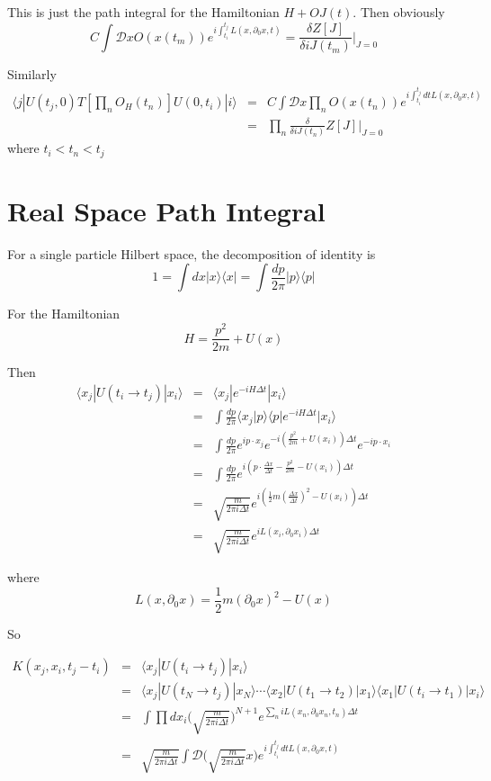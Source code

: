 \documentclass[12pt]{book}
\begin{document}
	This is just the path integral for the Hamiltonian $H+OJ(t)$. Then obviously
	\begin{equation}
		C\int \mathcal D x O(x(t_m))e^{i\int_{t_i}^{t_j}L(x,\partial_0 x,t)}=\frac {\delta Z[J]}{\delta iJ(t_m)}\bigg|_{J=0}
	\end{equation}
	
	Similarly
	\begin{eqnarray}
		\langle j|U(t_j,0)T[\prod_nO_H(t_n)]U(0,t_i)|i\rangle&=&C\int \mathcal D x\prod_n O(x(t_n))e^{i\int_{t_i}^{t_j}dtL(x,\partial_0 x,t)}\\
		&=&\prod_n\frac {\delta}{\delta iJ(t_n)}Z[J]|_{J=0}
	\end{eqnarray}
	where $t_i<t_n<t_j$
	\section{Real Space Path Integral}
	For a single particle Hilbert space, the decomposition of identity is
	\begin{equation}
		1=\int dx|x\rangle\langle x|=\int\frac{dp}{2\pi}|p\rangle\langle p|
	\end{equation}
	
	For the Hamiltonian 
	\begin{equation}
		H=\frac{p^2}{2m}+U(x)
	\end{equation}
	
	Then
	\begin{eqnarray}
		\langle x_j|U(t_i\rightarrow t_j)|x_i\rangle&=&\langle x_j|e^{-iH\Delta t}|x_i\rangle\\
		&=&\int\frac {dp}{2\pi}\langle x_j|p\rangle\langle p|e^{-iH\Delta t}|x_i\rangle\\
		&=&\int\frac {dp}{2\pi}e^{ip\cdot x_j}e^{-i(\frac {p^2}{2m}+U(x_i))\Delta t}e^{-ip\cdot x_i}\\
		&=&\int\frac {dp}{2\pi}e^{i(p\cdot\frac {\Delta x}{\Delta t}-\frac {p^2}{2m}-U(x_i))\Delta t}\\
		&=&\sqrt{\frac{m}{2\pi i\Delta t}}e^{i(\frac 12m(\frac{\Delta x}{\Delta t})^2-U(x_i))\Delta t}\\
		&=&\sqrt{\frac{m}{2\pi i\Delta t}}e^{iL(x_i,\partial_0 x_i)\Delta t}
	\end{eqnarray}
	
	where
	\begin{equation}
		L(x,\partial_0x)=\frac 12m(\partial_0x)^2-U(x)
	\end{equation}
	
	So
	
	\begin{eqnarray}
		K(x_j,x_i,t_j-t_i)&=&\langle x_j|U(t_i\rightarrow t_j)|x_i\rangle\\
		&=& \langle x_j|U(t_N\rightarrow t_j)|x_N\rangle\cdots \langle x_2|U(t_1 \rightarrow t_2)|x_1\rangle \langle x_1|U(t_i \rightarrow t_1)|x_i\rangle\\
		&=&\int\prod dx_i\bigg(\sqrt{\frac{m}{2\pi i\Delta t}}\bigg)^{N+1}e^{\sum_n iL( x_n,\partial_0  x_n,t_n)\Delta t}\\
		&=&\sqrt{\frac{m}{2\pi i\Delta t}}\int \mathcal D\bigg(\sqrt{\frac{m}{2\pi i\Delta t}}x\bigg)e^{i\int_{t_i}^{t_j}dtL(x,\partial_0 x,t)}
	\end{eqnarray}
	
\end{document}
